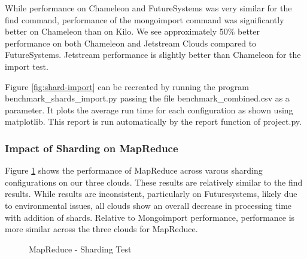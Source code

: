 \documentclass[9pt,twocolumn,twoside]{../../styles/osajnl}
\begin{document}
While performance on Chameleon and FutureSystems was very similar for the find command, performance of the mongoimport command was significantly better on Chameleon than on Kilo.  We see approximately 50\% better performance on both Chameleon and Jetstream Clouds compared to FutureSystems. Jetstream performance is slightly better than Chameleon for the import test.

Figure \ref{fig:shard-import} can be recreated by running the program benchmark\_shards\_import.py passing the file benchmark\_combined.csv as a parameter.  It plots the average run time for each configuration as shown using matplotlib.    This report is run automatically by the report function of project.py.

\subsubsection{Impact of Sharding on MapReduce}



Figure \ref{fig:shard-mapreduce} shows the performance of MapReduce across varous sharding configurations on our three clouds.  These results are relatively similar to the find results.  While results are inconsistent, particularly on Futuresystems, likely due to environmental issues, all clouds show an overall decrease in processing time with addition of shards.  Relative to Mongoimport performance, performance is more similar across the three clouds for MapReduce.

\begin{figure}[htbp]
\centering
{}
\caption{MapReduce - Sharding Test}
\label{fig:shard-mapreduce}
\end{figure}
\end{document}
